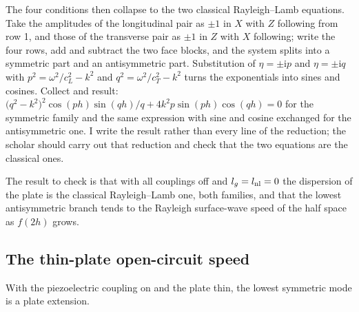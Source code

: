\documentclass[11pt]{article}
\makeatletter
\newif\ifshowworked
\newenvironment{worked}{%
  \ifshowworked\par\smallskip\noindent\textit{Working.}\par\smallskip\else
  \setbox\z@\vbox\bgroup\fi}{\ifshowworked\par\smallskip\else\egroup\fi}
\newcommand{\ii}{\mathrm{i}}
\makeatother
\begin{document}
\begin{worked}
The four conditions then collapse to the two classical Rayleigh--Lamb equations. Take the amplitudes of
the longitudinal pair as $\pm1$ in $X$ with $Z$ following from row 1, and those of the transverse pair as
$\pm1$ in $Z$ with $X$ following; write the four rows, add and subtract the two face blocks, and the
system splits into a symmetric part and an antisymmetric part. Substitution of $\eta=\pm\ii p$ and
$\eta=\pm\ii q$ with $p^2=\omega^2/c_L^2-k^2$ and $q^2=\omega^2/c_T^2-k^2$ turns the exponentials into
sines and cosines. Collect and result:
$\bigl(q^2-k^2\bigr)^2\cos(ph)\sin(qh)/q+4k^2p\sin(ph)\cos(qh)=0$ for the symmetric family and the same
expression with sine and cosine exchanged for the antisymmetric one. I write the result rather than every
line of the reduction; the scholar should carry out that reduction and check that the two equations are
the classical ones.
\end{worked}

The result to check is that with all couplings off and $l_g=l_{\rm nl}=0$ the dispersion of the plate is
the classical Rayleigh--Lamb one, both families, and that the lowest antisymmetric branch tends to the
Rayleigh surface-wave speed of the half space as $f(2h)$ grows.

\subsection*{The thin-plate open-circuit speed}

With the piezoelectric coupling on and the plate thin, the lowest symmetric mode is a plate extension.
\end{document}
